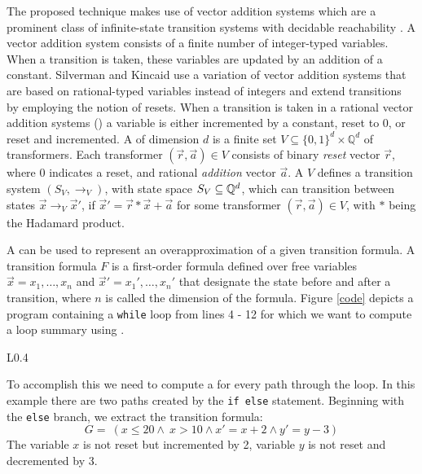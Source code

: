 The proposed technique makes use of vector addition systems which are a prominent class of infinite-state transition systems with decidable reachability \cite{DBLP:conf/rp/HaaseH14}. A vector addition system consists of a finite number of integer-typed variables. When a transition is taken, these variables are updated by an addition of a constant. Silverman and Kincaid use a variation of vector addition systems that are based on rational-typed variables instead of integers and extend transitions by employing the notion of resets. When a transition is taken in a rational vector addition systems (\qvasr) a variable is either incremented by a constant, reset to 0, or reset and incremented.
A \qvasr of dimension $d$ is a finite set $V \subseteq \{0, 1\}^d \times \mathbb{Q}^d$ of transformers. Each transformer $(\vec{r}, \vec{a}) \in V$ consists of binary \textsl{reset} vector $\vec{r}$, where 0 indicates a reset, and rational \textsl{addition} vector $\vec{a}$. A \qvasr $V$ defines a transition system $(S_V, \rightarrow_V)$, with state space $S_V \subseteq \mathbb{Q}^d$, which can transition between states $\vec{x} \rightarrow_V \vec{x}'$, if $\vec{x}' = \vec{r} * \vec{x} + \vec{a}$ for some transformer $(\vec{r}, \vec{a}) \in V$, with $*$ being the Hadamard product. \par A \qvasr can be used to represent an overapproximation of a given transition formula. A transition formula $F$ is a first-order formula defined over free variables $\vec{x} = x_1, \ldots, x_n$ and $\vec{x}' = x_1', \ldots, x_n'$ that designate the state before and after a transition, where $n$ is called the dimension of the formula. Figure \ref{code} depicts a program containing a \texttt{while} loop from lines 4 - 12 for which we want to compute a loop summary using \qvasr.
\begin{wrapfigure}{L}{0.4\linewidth}
	\vspace{-10pt}
	\centering
	
	\caption{Program $P$ \\ with \texttt{while} loop.}
	\label{code}
\end{wrapfigure}
To accomplish this we need to compute a \qvasr for every path through the loop. In this example there are two paths created by the \texttt{if else} statement.
Beginning with the \texttt{else} branch, we extract the transition formula:
\begin{equation*}
	G= \ (x \leq 20 \land\ x > 10 \land x' = x + 2 \land y' = y - 3)
\end{equation*}
The variable $x$ is not reset but incremented by 2, variable $y$ is not reset and decremented by 3.
